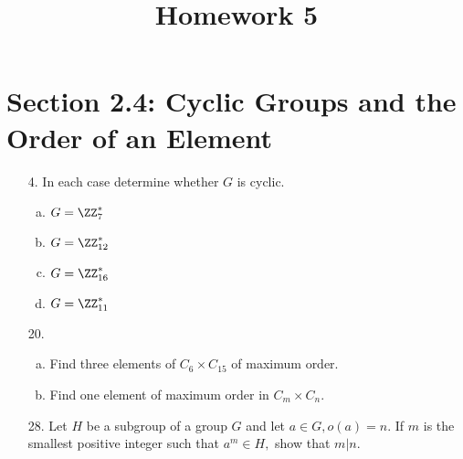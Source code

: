 \documentclass{article}
\begin{document}
\title{Homework 5}
\maketitle
\thispagestyle{fancy}

\section*{Section 2.4: Cyclic Groups and the Order of an Element}
\begin{itemize}
	\item[4.] In each case determine whether $G$ is cyclic.
		\begin{enumerate}[(a)]
			\item $G=\ZZ_7^*$

			\item $G=\ZZ_{12}^*$

			\item $G=\ZZ_{16}^*$

			\item $G=\ZZ_{11}^*$
				
		\end{enumerate}

	\item[20.] \begin{enumerate}[(a)]
			\item Find three elements of $C_6\times C_{15}$ of maximum order.

			\item Find one element of maximum order in $C_m\times C_n.$
				
		\end{enumerate}

	\item[28.] Let $H$ be a subgroup of a group $G$ and let $a\in G, o(a)=n.$ If $m$ is the smallest positive integer such that $a^m\in H,$ show that $m|n.$
		
\end{itemize}
\end{document}
